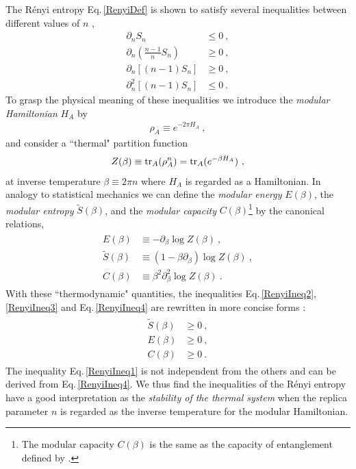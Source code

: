 The R{\'e}nyi entropy Eq.\,\eqref{RenyiDef} is shown to satisfy several inequalities between different values of $n$ \cite{zyczkowski2003renyi},
\begin{align}
\partial_n S_n &\le 0 \ , \label{RenyiIneq1}\\
\partial_n \left( \frac{n-1}{n} S_n\right) &\ge 0 \ ,\label{RenyiIneq2}\\
\partial_n \left[ (n-1)S_n\right] &\ge 0 \ , \label{RenyiIneq3}\\
\partial_n^2 \left[ (n-1)S_n\right] &\le 0 \ . \label{RenyiIneq4}
\end{align}
To grasp the physical meaning of these inequalities we introduce the \emph{modular Hamiltonian} $H_A$ by
\begin{align}
	\rho_A \equiv e^{- 2\pi H_A}\ ,
\end{align}
and consider a ``thermal" partition function
\begin{align}\label{Thermal_PF}
	Z(\beta) \equiv {\rm tr}_A (\rho_A^n) = {\rm tr}_A (e^{- \beta H_A}) \ ,
\end{align}
at inverse temperature $\beta \equiv 2\pi n$ where $H_A$ is regarded as a Hamiltonian.
In analogy to statistical mechanics we can define the \emph{modular energy} $E(\beta)$, the \emph{modular entropy}  $\tilde S(\beta)$, and the \emph{modular capacity} $C(\beta)$\footnote{The modular capacity $C(\beta)$ is the same as the capacity of entanglement defined by \textcite{Yao:2010woi}.} by the canonical relations,
\begin{align}\label{ModularEntropy}
	\begin{aligned}
		E(\beta) &\equiv - \partial_\beta \log Z(\beta) \ ,\\
		\tilde S(\beta) &\equiv (1-\beta \partial_\beta) \log Z(\beta) \ ,\\
		C(\beta) &\equiv \beta^2 \partial_\beta^2 \log Z(\beta) \ .
	\end{aligned}
\end{align}
With these ``thermodynamic" quantities, the inequalities Eq.\,\eqref{RenyiIneq2}, \eqref{RenyiIneq3} and Eq.\,\eqref{RenyiIneq4} are rewritten in more concise forms \cite{Hung:2011nu,Nakaguchi:2016zqi}:
\begin{align}\label{Modular_Ineq}
	\begin{aligned}
		\tilde S(\beta) &\ge 0 \ , \\
		E(\beta) & \ge 0 \ , \\
		C(\beta) &\ge 0 \ .
	\end{aligned}
\end{align}
The inequality Eq.\,\eqref{RenyiIneq1} is not independent from the others and can be derived from Eq.\,\eqref{RenyiIneq4}.
We thus find the inequalities of the R{\'e}nyi entropy have a good interpretation as the \emph{stability of the thermal system} when the replica parameter $n$ is regarded as the inverse temperature for the modular Hamiltonian.

